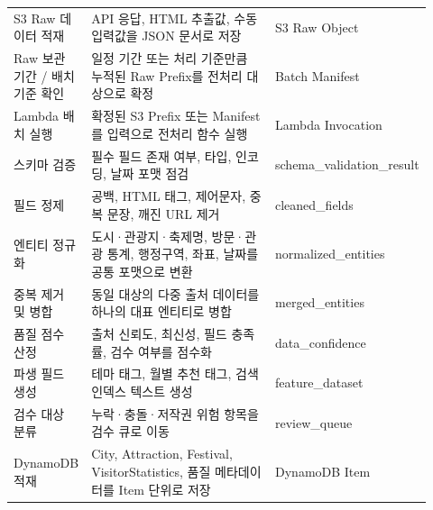 \documentclass[12pt,a4paper]{article}
\newcommand{\DocNeedspace}[1]{\par\ifdim\dimexpr\pagegoal-\pagetotal\relax<#1\newpage\fi}
\begin{document}
\DocNeedspace{28\baselineskip}
\begin{small}
\begin{longtable}{@{}>{\RaggedRight\arraybackslash}m{0.122\linewidth}>{\RaggedRight\arraybackslash}m{0.519\linewidth}>{\RaggedRight\arraybackslash}m{0.279\linewidth}@{}}
\toprule
\multicolumn{1}{>{\centering\arraybackslash}m{0.122\linewidth}}{\textbf{단계}} & \multicolumn{1}{>{\centering\arraybackslash}m{0.519\linewidth}}{\textbf{처리 내용}} & \multicolumn{1}{>{\centering\arraybackslash}m{0.279\linewidth}}{\textbf{산출물}} \\
\midrule
\endhead
S3 Raw 데이터 적재 & API 응답, HTML 추출값, 수동 입력값을 JSON 문서로 저장 & S3 Raw Object \\
Raw 보관 기간 / 배치 기준 확인 & 일정 기간 또는 처리 기준만큼 누적된 Raw Prefix를 전처리 대상으로 확정 & Batch Manifest \\
Lambda 배치 실행 & 확정된 S3 Prefix 또는 Manifest를 입력으로 전처리 함수 실행 & Lambda Invocation \\
스키마 검증 & 필수 필드 존재 여부, 타입, 인코딩, 날짜 포맷 점검 & {\footnotesize schema\_\allowbreak{}validation\_\allowbreak{}result} \\
필드 정제 & 공백, HTML 태그, 제어문자, 중복 문장, 깨진 URL 제거 & {\footnotesize cleaned\_\allowbreak{}fields} \\
엔티티 정규화 & 도시·관광지·축제명, 방문·관광 통계, 행정구역, 좌표, 날짜를 공통 포맷으로 변환 & {\footnotesize normalized\_\allowbreak{}entities} \\
중복 제거 및 병합 & 동일 대상의 다중 출처 데이터를 하나의 대표 엔티티로 병합 & {\footnotesize merged\_\allowbreak{}entities} \\
품질 점수 산정 & 출처 신뢰도, 최신성, 필드 충족률, 검수 여부를 점수화 & {\footnotesize data\_\allowbreak{}confidence} \\
파생 필드 생성 & 테마 태그, 월별 추천 태그, 검색 인덱스 텍스트 생성 & {\footnotesize feature\_\allowbreak{}dataset} \\
검수 대상 분류 & 누락·충돌·저작권 위험 항목을 검수 큐로 이동 & {\footnotesize review\_\allowbreak{}queue} \\
DynamoDB 적재 & City, Attraction, Festival, VisitorStatistics, 품질 메타데이터를 Item 단위로 저장 & DynamoDB Item \\
\bottomrule
\end{longtable}
\end{small}


\newpage

\DocNeedspace{10\baselineskip}
\end{document}
